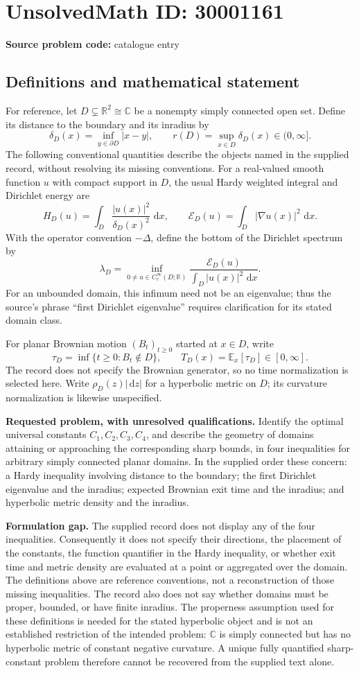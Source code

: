 \documentclass[11pt]{article}
\newcommand{\R}{\mathbb{R}}
\newcommand{\C}{\mathbb{C}}
\newcommand{\dd}{\,\mathrm{d}}
\begin{document}
\section*{UnsolvedMath ID: 30001161}
\textbf{Source problem code:} catalogue entry
\subsection{Definitions and mathematical statement}
For reference, let \(D\subsetneq\R^2\cong\C\) be a nonempty simply connected open set. Define its distance to the boundary and its inradius by
\[
\delta_D(x)=\inf_{y\in\partial D}|x-y|,
\qquad
r(D)=\sup_{x\in D}\delta_D(x)\in(0,\infty].
\]
The following conventional quantities describe the objects named in the supplied record, without resolving its missing conventions. For a real-valued smooth function \(u\) with compact support in \(D\), the usual Hardy weighted integral and Dirichlet energy are
\[
H_D(u)=\int_D\frac{|u(x)|^2}{\delta_D(x)^2}\,\dd x,
\qquad
\mathcal E_D(u)=\int_D|\nabla u(x)|^2\,\dd x.
\]
With the operator convention \(-\Delta\), define the bottom of the Dirichlet spectrum by
\[
\lambda_D=\inf_{0\ne u\in C_c^\infty(D;\R)}
\frac{\mathcal E_D(u)}{\int_D|u(x)|^2\,\dd x}.
\]
For an unbounded domain, this infimum need not be an eigenvalue; thus the source's phrase ``first Dirichlet eigenvalue'' requires clarification for its stated domain class.

For planar Brownian motion \((B_t)_{t\ge0}\) started at \(x\in D\), write
\[
\tau_D=\inf\{t\ge0:B_t\notin D\},
\qquad
T_D(x)=\mathbb E_x[\tau_D]\in[0,\infty].
\]
The record does not specify the Brownian generator, so no time normalization is selected here. Write \(\rho_D(z)|\dd z|\) for a hyperbolic metric on \(D\); its curvature normalization is likewise unspecified.

\textbf{Requested problem, with unresolved qualifications.} Identify the optimal universal constants \(C_1,C_2,C_3,C_4\), and describe the geometry of domains attaining or approaching the corresponding sharp bounds, in four inequalities for arbitrary simply connected planar domains. In the supplied order these concern: a Hardy inequality involving distance to the boundary; the first Dirichlet eigenvalue and the inradius; expected Brownian exit time and the inradius; and hyperbolic metric density and the inradius.

\textbf{Formulation gap.} The supplied record does not display any of the four inequalities. Consequently it does not specify their directions, the placement of the constants, the function quantifier in the Hardy inequality, or whether exit time and metric density are evaluated at a point or aggregated over the domain. The definitions above are reference conventions, not a reconstruction of those missing inequalities. The record also does not say whether domains must be proper, bounded, or have finite inradius. The properness assumption used for these definitions is needed for the stated hyperbolic object and is not an established restriction of the intended problem: \(\C\) is simply connected but has no hyperbolic metric of constant negative curvature. A unique fully quantified sharp-constant problem therefore cannot be recovered from the supplied text alone.
\end{document}
